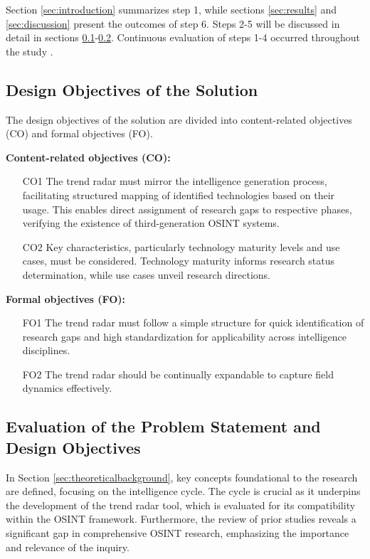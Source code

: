 \documentclass[10pt]{article}
\begin{document}
Section \ref{sec:introduction} summarizes step 1, while sections \ref{sec:results} and \ref{sec:discussion} present the outcomes of step 6. Steps 2-5 will be discussed in detail in sections \ref{sec:designobjectives}-\ref{sec:eval}. Continuous evaluation of steps 1-4 occurred throughout the study \cite{Sonnenberg.2012}.


\subsection{Design Objectives of the Solution} \label{sec:designobjectives}


The design objectives of the solution are divided into content-related objectives (CO) and formal objectives (FO).

\textbf{Content-related objectives (CO):}
\begin{itemize}
    \item[CO1] The trend radar must mirror the intelligence generation process, facilitating structured mapping of identified technologies based on their usage. This enables direct assignment of research gaps to respective phases, verifying the existence of third-generation OSINT systems.
    \item[CO2] Key characteristics, particularly technology maturity levels and use cases, must be considered. Technology maturity informs research status determination, while use cases unveil research directions.
\end{itemize}

\textbf{Formal objectives (FO):}
\begin{itemize}
    \item[FO1] The trend radar must follow a simple structure for quick identification of research gaps and high standardization for applicability across intelligence disciplines.
    \item[FO2] The trend radar should be continually expandable to capture field dynamics effectively.
\end{itemize}

\subsection{Evaluation of the Problem Statement and Design Objectives} \label{sec:eval}
In Section \ref{sec:theoreticalbackground}, key concepts foundational to the research are defined, focusing on the intelligence cycle. The cycle is crucial as it underpins the development of the trend radar tool, which is evaluated for its compatibility within the OSINT framework. Furthermore, the review of prior studies reveals a significant gap in comprehensive OSINT research, emphasizing the importance and relevance of the inquiry.
\end{document}
